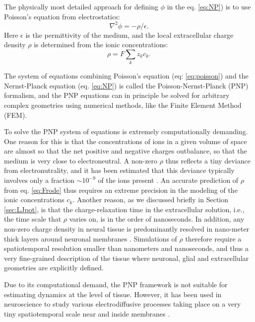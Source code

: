 \subsubsection{}
The physically most detailed approach for defining $\phi$ in the eq. \ref{eq:NP}) is to use Poisson's equation from electrostatics:
\begin{equation}
\nabla^2 \phi = -\rho/\epsilon.
\label{eq:poisson}
\end{equation}
Here $\epsilon$ is the permittivity of the medium, and the local extracellular charge density $\rho$ is determined from the ionic concentrations: 
\begin{equation}
\rho = F \sum_k z_k c_k.
\label{eq:Frode}
\end{equation}

The system of equations combining Poisson's equation (eq: \ref{eq:poisson}) and the Nernst-Planck equation (eq. \ref{eq:NP})
is called the Poisson-Nernst-Planck (PNP) formalism, and the PNP equations can in principle be solved for arbitrary complex geometries using numerical methods, like the Finite Element Method (FEM). 

To solve the PNP system of equations is extremely computationally demanding. One reason for this is that the concentrations of ions in a given volume of space are almost so that the net positive and negative charges outbalance, so that the medium is very close to electroneutral. A non-zero $\rho$ thus reflects a tiny deviance from electronutrality, and it has been estimated that this deviance typically involves only a fraction $\sim 10^{-9}$ of the ions present \cite{Aguilella1986}. An accurate prediction of $\rho$ from eq. \ref{eq:Frode} thus requires an extreme precision in the modeling of the ionic concentrations $c_k$. Another reason, as we discussed briefly in Section \ref{sec:LJpot}, is that the charge-relaxation time in the extracellular solution, i.e., the time scale that $\rho$ varies on, is in the order of nanoseconds. In addition, any non-zero charge density in neural tissue is predominantly resolved in nano-meter thick layers around neuronal membranes \cite{Grodzinsky2011, Gratiy2017}. Simulations of $\rho$ therefore require a spatiotemporal resolution smaller than nanometers and nanoseconds, and thus a very fine-grained description of the tissue where neuronal, glial and extracellular geometries are explicitly defined.

Due to its computational demand, the PNP framework is not suitable for estimating dynamics at the level of tissue. However, it has been used in neuroscience to study various electrodiffusive processes taking place on a very tiny spatiotemporal scale near and inside membranes \cite{Leonetti1998, Leonetti2004, Lu2007, Lopreore2008, Nanninga2008, Pods2013, Gardner2015}. 


